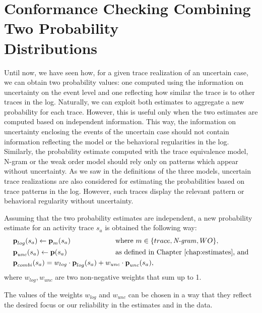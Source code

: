 \section{Conformance Checking Combining Two Probability \\ Distributions}
Until now, we have seen how, for a given trace realization of an uncertain case, we can obtain two probability values: one computed using the information on uncertainty on the event level and one reflecting how similar the trace is to other traces in the log.
Naturally, we can exploit both estimates to aggregate a new probability for each trace.
However, this is useful only when the two estimates are computed based on independent information.
This way, the information on uncertainty enclosing the events of the uncertain case should not contain information reflecting the model or the behavioral regularities in the log.
Similarly, the probability estimate computed with the trace equivalence model, N-gram or the weak order model should rely only on patterns which appear without uncertainty.
As we saw in the definitions of the three models, uncertain trace realizations are also considered for estimating the probabilities based on trace patterns in the log.
However, such traces display the relevant pattern or behavioral regularity without uncertainty.
 
Assuming that the two probability estimates are independent, a new probability estimate for an activity trace $s_a$ is obtained the following way:
\begin{align*}
&\textbf{p}_{log}(s_a) \gets \textbf{p}_m(s_a) \text{ \hspace*{2cm} where } m \in \{trace,{\text{\textit{N-gram}}},WO\}, \\
&\textbf{p}_{unc}(s_a) \gets \textbf{p}(s_a) \text{\hspace*{2,3cm} as defined in Chapter \ref{chap:estimates}, and} \\ 
&\textbf{p}_{combi}(s_a) = w_{log} \cdot \textbf{p}_{log}(s_a) + w_{unc} \cdot \textbf{p}_{unc}(s_a),
\end{align*}
where $w_{log}, w_{unc}$ are two non-negative weights that sum up to 1.

The values of the weights $w_{log}$ and $w_{unc}$ can be chosen in a way that they reflect the desired focus or our reliability in the estimates and in the data.


